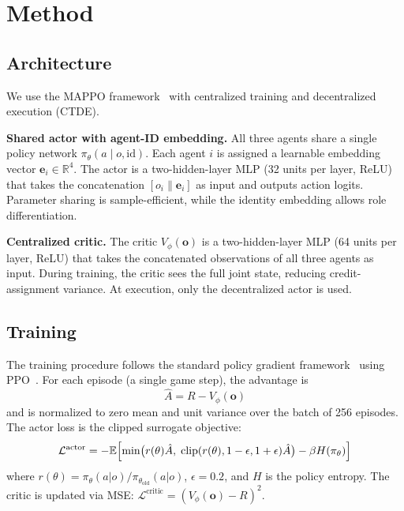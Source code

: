 \documentclass[journal]{IEEEtran}
\begin{document}
\section{Method}

\subsection{Architecture}

We use the MAPPO framework~\cite{yu2022mappo} with centralized training and decentralized execution (CTDE).

\textbf{Shared actor with agent-ID embedding.} All three agents share a single policy network $\pi_\theta(a \mid o, \text{id})$. Each agent $i$ is assigned a learnable embedding vector $\mathbf{e}_i \in \mathbb{R}^4$. The actor is a two-hidden-layer MLP (32 units per layer, ReLU) that takes the concatenation $[o_i \parallel \mathbf{e}_i]$ as input and outputs action logits. Parameter sharing is sample-efficient, while the identity embedding allows role differentiation.

\textbf{Centralized critic.} The critic $V_\phi(\mathbf{o})$ is a two-hidden-layer MLP (64 units per layer, ReLU) that takes the concatenated observations of all three agents as input. During training, the critic sees the full joint state, reducing credit-assignment variance. At execution, only the decentralized actor is used.

\subsection{Training}

The training procedure follows the standard policy gradient framework~\cite{sutton2018book} using PPO~\cite{schulman2017ppo}. For each episode (a single game step), the advantage is
\begin{equation}
    \hat{A} = R - V_\phi(\mathbf{o})
\end{equation}
and is normalized to zero mean and unit variance over the batch of 256 episodes. The actor loss is the clipped surrogate objective:
\begin{equation}
    \mathcal{L}^{\text{actor}} = -\mathbb{E}\Bigl[\min\bigl(r(\theta)\hat{A},\; \text{clip}(r(\theta), 1-\epsilon, 1+\epsilon)\hat{A}\bigr) - \beta H(\pi_\theta)\Bigr]
\end{equation}
where $r(\theta) = \pi_\theta(a|o) / \pi_{\theta_{\text{old}}}(a|o)$, $\epsilon = 0.2$, and $H$ is the policy entropy. The critic is updated via MSE: $\mathcal{L}^{\text{critic}} = (V_\phi(\mathbf{o}) - R)^2$.
\end{document}
